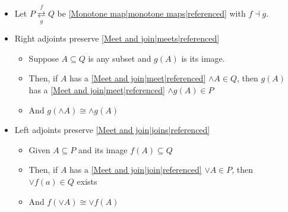 

\begin{itemize}
    \item Let $P \overset{f}{\underset{g}{\rightleftarrows}} Q$ be \ref{Monotone map|monotone maps|referenced} with $f \dashv g$.
    \item Right adjoints preserve \ref{Meet and join|meets|referenced}
          \begin{itemize}
            \item Suppose $A \subseteq Q$ is any subset and $g(A)$ is its image.
            \item Then, if $A$ has a \ref{Meet and join|meet|referenced} $\wedge A \in Q$, then $g(A)$ has a \ref{Meet and join|meet|referenced} $\wedge g(A) \in P$
            \item And $g(\wedge A) \cong \wedge g(A)$
          \end{itemize}
    \item Left adjoints preserve \ref{Meet and join|joins|referenced}
          \begin{itemize}
            \item Given $A \subseteq P$ and its image $f(A) \subseteq Q$
            \item Then, if $A$ has a \ref{Meet and join|join|referenced} $\vee A \in P$, then $\vee f(a) \in Q$ exists
            \item And $f(\vee A) \cong \vee f(A)$     \end{itemize}
  \end{itemize}